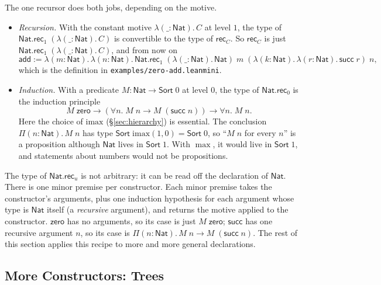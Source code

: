 \documentclass[acmsmall,screen,nonacm]{acmart}
\newcommand{\Sort}[1]{\mathsf{Sort}\;#1}
\newcommand{\tPi}[3]{\Pi(#1{:}#2).\,#3}
\newcommand{\tLam}[3]{\lambda(#1{:}#2).\,#3}
\newcommand{\imax}{\mathrm{imax}}
\newcommand{\Nat}{\mathsf{Nat}}
\newcommand{\zero}{\mathsf{zero}}
\newcommand{\tsucc}{\mathsf{succ}}
\newcommand{\add}{\mathsf{add}}
\newcommand{\NatRec}[1]{\mathsf{Nat.rec}_{#1}}
\begin{document}
The one recursor does both jobs, depending on the motive.
\begin{itemize}
  \item \emph{Recursion.} With the constant motive $\tLam{\_}{\Nat}{C}$ at level $1$, the type of $\NatRec{1}\;(\tLam{\_}{\Nat}{C})$ is convertible to the type of $\mathsf{rec}_C$.
    So $\mathsf{rec}_C$ is just $\NatRec{1}\;(\tLam{\_}{\Nat}{C})$, and from now on
    \[
    \add \mathrel{:=} \tLam{m}{\Nat}{\tLam{n}{\Nat}{\NatRec{1}\;(\tLam{\_}{\Nat}{\Nat})\;m\;(\tLam{k}{\Nat}{\tLam{r}{\Nat}{\tsucc\;r}})\;n}},
    \]
    which is the definition in \texttt{examples/zero-add.leanmini}.
  \item \emph{Induction.} With a predicate $M : \Nat \to \Sort{0}$ at level $0$, the type of $\NatRec{0}$ is the induction principle
    \[
    M\;\zero \to (\forall n.\; M\;n \to M\;(\tsucc\;n)) \to \forall n.\; M\;n.
    \]
    Here the choice of $\imax$ (\S\ref{sec:hierarchy}) is essential.
    The conclusion $\tPi{n}{\Nat}{M\;n}$ has type $\Sort{\imax(1, 0)} = \Sort{0}$, so ``$M\;n$ for every $n$'' is a proposition although $\Nat$ lives in $\Sort{1}$.
    With $\max$, it would live in $\Sort{1}$, and statements about numbers would not be propositions.
\end{itemize}

The type of $\NatRec{u}$ is not arbitrary: it can be read off the declaration of $\Nat$.
There is one minor premise per constructor.
Each minor premise takes the constructor's arguments, plus one induction hypothesis for each argument whose type is $\Nat$ itself (a \emph{recursive} argument),
and returns the motive applied to the constructor.
$\zero$ has no arguments, so its case is just $M\;\zero$; $\tsucc$ has one recursive argument $n$, so its case is $\tPi{n}{\Nat}{M\;n \to M\;(\tsucc\;n)}$.
The rest of this section applies this recipe to more and more general declarations.

\subsection{More Constructors: Trees}
\label{sec:tree}
\end{document}
